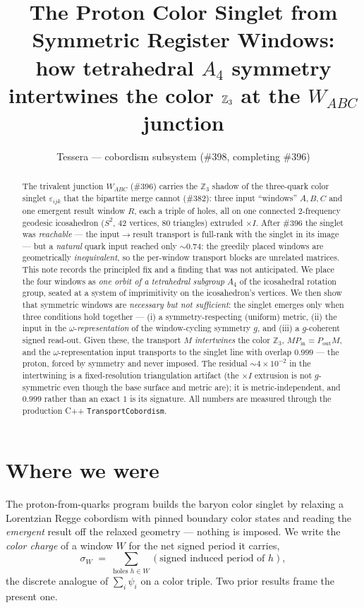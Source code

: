 \documentclass[11pt]{article}
\title{\bfseries The Proton Color Singlet from Symmetric Register Windows:\\
how tetrahedral $A_4$ symmetry intertwines the color $\Z_3$ at the $W_{ABC}$ junction}
\author{Tessera --- cobordism subsystem (\#398, completing \#396)}
\date{}
\theoremstyle{definition}
\newcommand{\Z}{\mathbb{Z}}
\newcommand{\sigmacol}{\sigma}
\newcommand{\Pin}{P_{\mathrm{in}}}
\newcommand{\Pout}{P_{\mathrm{out}}}
\begin{document}
\maketitle

\begin{abstract}
The trivalent junction $W_{ABC}$ (\#396) carries the $\Z_3$ shadow of the
three-quark color singlet $\varepsilon_{ijk}$ that the bipartite merge cannot
(\#382): three input ``windows'' $A,B,C$ and one emergent result window $R$, each a
triple of holes, all on one connected $2$-frequency geodesic icosahedron ($S^2$,
$42$ vertices, $80$ triangles) extruded $\times I$. After \#396 the singlet was
\emph{reachable} --- the input$\to$result transport is full-rank with the singlet in
its image --- but a \emph{natural} quark input reached only $\sim 0.74$: the greedily
placed windows are geometrically \emph{inequivalent}, so the per-window transport
blocks are unrelated matrices. This note records the principled fix and a finding
that was not anticipated. We place the four windows as \emph{one orbit of a
tetrahedral subgroup} $A_4$ of the icosahedral rotation group, seated at a system of
imprimitivity on the icosahedron's vertices. We then show that symmetric windows are
\emph{necessary but not sufficient}: the singlet emerges only when three conditions
hold together --- (i) a symmetry-respecting (uniform) metric, (ii) the input in the
$\omega$-\emph{representation} of the window-cycling symmetry $g$, and (iii) a
$g$-coherent signed read-out. Given these, the transport $M$ \emph{intertwines} the
color $\Z_3$, $M\Pin=\Pout M$, and the $\omega$-representation input transports to the
singlet line with overlap $0.999$ --- the proton, forced by symmetry and never
imposed. The residual $\sim 4\times 10^{-2}$ in the intertwining is a fixed-resolution
triangulation artifact (the $\times I$ extrusion is not $g$-symmetric even though the
base surface and metric are); it is metric-independent, and $0.999$ rather than an
exact $1$ is its signature. All numbers are measured through the production C++
\texttt{TransportCobordism}.
\end{abstract}

\tableofcontents

\section{Where we were}
\label{sec:context}

The proton-from-quarks program builds the baryon color singlet by relaxing a
Lorentzian Regge cobordism with pinned boundary color states and reading the
\emph{emergent} result off the relaxed geometry --- nothing is imposed. We write the
\emph{color charge} of a window $W$ for the net signed period it carries,
\begin{equation}
  \sigmacol_W \;=\; \sum_{\text{holes } h\in W} (\text{signed induced period of } h),
  \label{eq:charge}
\end{equation}
the discrete analogue of $\sum_i \psi_i$ on a color triple. Two prior results frame
the present one.
\end{document}
